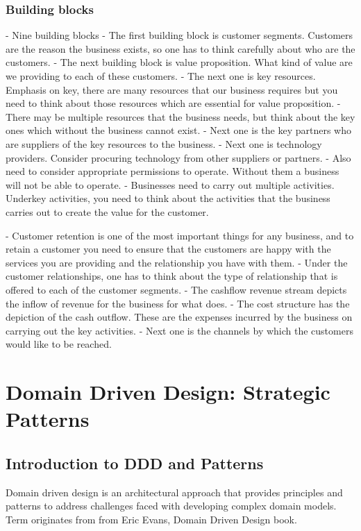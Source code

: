\documentclass[a4paper, 11pt]{book}
\begin{document}
    \subsection{Building blocks}
    - Nine building blocks
    - The first building block is customer segments. Customers are the reason the business exists, so one has to think carefully about who are the customers.
    - The next building block is value proposition. What kind of value are we providing to each of these customers.
    - The next one is key resources. Emphasis on key, there are many resources that our business requires but you need to think about those resources which are essential for value proposition.
    - There may be multiple resources that the business needs, but think about the key ones which without the business cannot exist.
    - Next one is the key partners who are suppliers of the key resources to the business.
    - Next one is technology providers. Consider procuring technology from other suppliers or partners.
    - Also need to consider appropriate permissions to operate. Without them a business will not be able to operate.
    - Businesses need to carry out multiple activities. Underkey activities, you need to think about the activities that the business carries out to create the value for the customer.

    - Customer retention is one of the most important things for any business, and to retain a customer you need to ensure that the customers are happy with the services you are providing and the relationship you have with them.
    - Under the customer relationships, one has to think about the type of relationship that is offered to each of the customer segments.
    - The cashflow revenue stream depicts the inflow of revenue for the business for what does.
    - The cost structure has the depiction of the cash outflow. These are the expenses incurred by the business on carrying out the key activities.
    - Next one is the channels by which the customers would like to be reached.



    \chapter{Domain Driven Design: Strategic Patterns}


    \section{Introduction to DDD and Patterns}
    Domain driven design is an architectural approach that provides principles and patterns to address challenges faced with developing complex domain models.
    Term originates from from Eric Evans, Domain Driven Design book.
\end{document}
